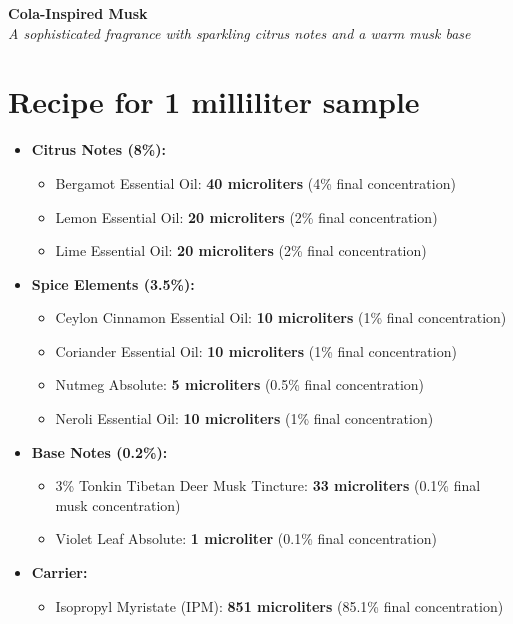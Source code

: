 \documentclass{article}
\begin{document}
\begin{center}
\textcolor{colaDark}{\LARGE\textbf{Cola-Inspired Musk}}\\[0.5cm]
\textcolor{colaBrown}{\large\textit{A sophisticated fragrance with sparkling citrus notes and a warm musk base}}\\[1cm]
\end{center}

\section*{Recipe for 1 milliliter sample}

\begin{itemize}[leftmargin=*]
  \item \textcolor{colaRed}{\textbf{Citrus Notes (8\%):}}
  \begin{itemize}
    \item Bergamot Essential Oil: \textbf{40 microliters} (4\% final concentration)
    \item Lemon Essential Oil: \textbf{20 microliters} (2\% final concentration)
    \item Lime Essential Oil: \textbf{20 microliters} (2\% final concentration)
  \end{itemize}
  
  \item \textcolor{colaRed}{\textbf{Spice Elements (3.5\%):}}
  \begin{itemize}
    \item Ceylon Cinnamon Essential Oil: \textbf{10 microliters} (1\% final concentration)
    \item Coriander Essential Oil: \textbf{10 microliters} (1\% final concentration)
    \item Nutmeg Absolute: \textbf{5 microliters} (0.5\% final concentration)
    \item Neroli Essential Oil: \textbf{10 microliters} (1\% final concentration)
  \end{itemize}
  
  \item \textcolor{colaRed}{\textbf{Base Notes (0.2\%):}}
  \begin{itemize}
    \item 3\% Tonkin Tibetan Deer Musk Tincture: \textbf{33 microliters} (0.1\% final musk concentration)
    \item Violet Leaf Absolute: \textbf{1 microliter} (0.1\% final concentration)
  \end{itemize}
  
  \item \textcolor{colaRed}{\textbf{Carrier:}}
  \begin{itemize}
    \item Isopropyl Myristate (IPM): \textbf{851 microliters} (85.1\% final concentration)
  \end{itemize}
\end{itemize}
\end{document}
